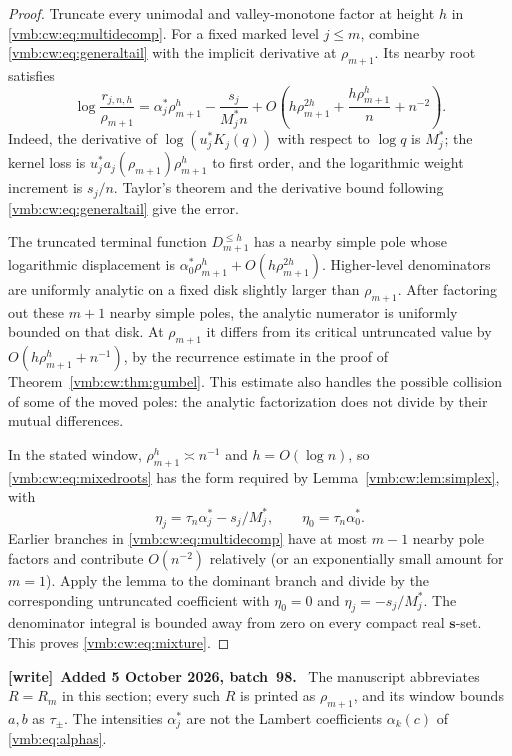 \documentclass[11pt,a4paper]{article}
\numberwithin{equation}{section}
\theoremstyle{definition}\newtheorem{definition}[theorem]{Definition}
\theoremstyle{remark}\newtheorem{remark}[theorem]{Remark}
\newenvironment{writenote}[1][]{\par\smallskip\begingroup\small
 \noindent\textbf{[write]}\if\relax\detokenize{#1}\relax\else~\textbf{#1.}\fi\ }%
 {\par\endgroup\smallskip}
\begin{document}
\begin{proof}
Truncate every unimodal and valley-monotone factor at height $h$ in
\eqref{vmb:cw:eq:multidecomp}. For a fixed marked level $j\le m$, combine
\eqref{vmb:cw:eq:generaltail} with the implicit derivative at $\rho_{m+1}$. Its nearby
root satisfies
\begin{equation}\label{vmb:cw:eq:mixedroots}
 \log\frac{r_{j,n,h}}{\rho_{m+1}}
 =\alpha_j^*\rho_{m+1}^h-\frac{s_j}{M_j^*n}
 +O\left(h\rho_{m+1}^{2h}+\frac{h\rho_{m+1}^h}{n}+n^{-2}\right).
\end{equation}
Indeed, the derivative of $\log(u_j^*K_j(q))$ with respect to $\log q$
is $M_j^*$; the kernel loss is $u_j^*a_j(\rho_{m+1})\rho_{m+1}^h$ to first order, and the
logarithmic weight increment is $s_j/n$. Taylor's theorem and the
derivative bound following \eqref{vmb:cw:eq:generaltail} give the error.

The truncated terminal function $D_{m+1}^{\le h}$ has a nearby simple pole
whose logarithmic displacement is
$\alpha_0^*\rho_{m+1}^h+O(h\rho_{m+1}^{2h})$. Higher-level denominators are uniformly analytic
on a fixed disk slightly larger than $\rho_{m+1}$. After factoring out these $m+1$
nearby simple poles, the analytic numerator is uniformly bounded on that
disk. At $\rho_{m+1}$ it differs from its critical untruncated value by
$O(h\rho_{m+1}^h+n^{-1})$, by the recurrence estimate in the proof of
Theorem~\ref{vmb:cw:thm:gumbel}. This estimate also handles the possible collision
of some of the moved poles: the analytic factorization does not divide by
their mutual differences.

In the stated window, $\rho_{m+1}^h\asymp n^{-1}$ and $h=O(\log n)$, so
\eqref{vmb:cw:eq:mixedroots} has the form required by Lemma~\ref{vmb:cw:lem:simplex},
with
\[
 \eta_j=\tau_n\alpha_j^*-s_j/M_j^*,\qquad
 \eta_0=\tau_n\alpha_0^*.
\]
Earlier branches in \eqref{vmb:cw:eq:multidecomp} have at most $m-1$ nearby pole
factors and contribute $O(n^{-2})$ relatively (or an exponentially small
amount for $m=1$). Apply the lemma to the dominant branch and divide by
the corresponding untruncated coefficient with $\eta_0=0$ and
$\eta_j=-s_j/M_j^*$. The denominator integral is bounded away from zero
on every compact real $\bm s$-set. This proves \eqref{vmb:cw:eq:mixture}.
\end{proof}

\begin{writenote}[Added 5 October 2026, batch~98]
The manuscript abbreviates $R=R_m$ in this section; every such $R$ is
printed as $\rho_{m+1}$, and its window bounds $a,b$ as $\tau_\pm$. The
intensities $\alpha_j^*$ are not the Lambert coefficients $\alpha_k(c)$ of
\eqref{vmb:eq:alphas}.
\end{writenote}
\end{document}

